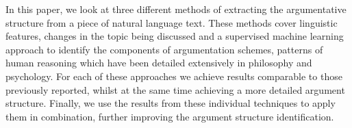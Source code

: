 In this paper, we look at three different methods of extracting the argumentative structure from a piece of natural language text. These methods cover linguistic features, changes in the topic being discussed and a supervised machine learning approach to identify the components of argumentation schemes, patterns of human reasoning which have been detailed extensively in philosophy and psychology. For each of these approaches we achieve results comparable to those previously reported, whilst at the same time achieving a more detailed argument structure. Finally, we use the results from these individual techniques to apply them in combination, further improving the argument structure identification.
